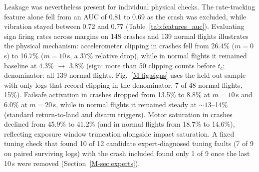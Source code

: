 \documentclass[preprint,12pt]{elsarticle}
\begin{document}
Leakage was nevertheless present for individual physical checks. The rate-tracking feature alone fell from an AUC of 0.81
to 0.69 as the crash was excluded, while vibration stayed between 0.72 and 0.77 (Table~\ref{tab:features_auc}). Evaluating sign firing rates across margins on 148 crashes and 139 normal flights illustrates the physical mechanism: accelerometer clipping in crashes fell from 26.4\% ($m=0$\,s) to 16.7\% ($m=10$\,s, a 37\% relative drop), while in normal flights it remained baseline at 4.3\% $\to$ 3.8\% (sign: more than 50 clipping counts before $t_c$; denominator: all 139 normal flights. Fig.~\ref{M-fig:signs} uses the held-out sample with only logs that record clipping in the denominator, 7 of 48 normal flights, 15\%). Failsafe activation in crashes dropped from 13.5\% to 8.8\% at $m=10$\,s and 6.0\% at $m=20$\,s, while in normal flights it remained steady at $\sim 13$--14\% (standard return-to-land and disarm triggers). Motor saturation in crashes declined from 45.9\% to 41.2\% (and in normal flights from 18.7\% to 14.6\%), reflecting exposure window truncation alongside impact saturation. A fixed tuning check that found 10 of 12
candidate expert-diagnosed tuning faults (7 of 9 on paired surviving logs) with the crash included found only 1 of 9 once
the last 10\,s were removed (Section~\ref{M-sec:experts}).
\end{document}
